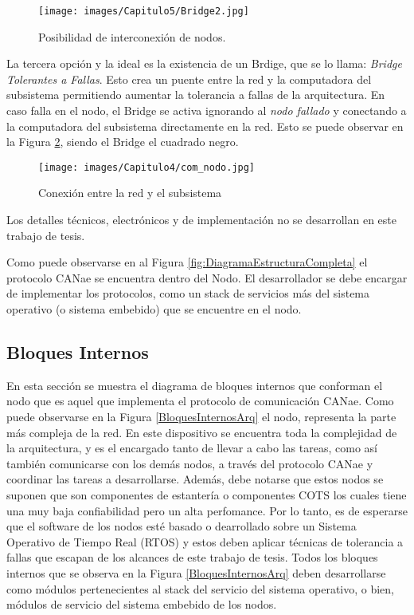 \begin{figure}[h!]
 \centering
 \texttt{[image: images/Capitulo5/Bridge2.jpg]}
  \caption{Posibilidad de interconexión de nodos.}
\label{fig:Bridge2}
\end{figure} 

La tercera opción y la ideal es la existencia de un Brdige, que se lo llama: 
\textit{Bridge Tolerantes a Fallas}. Esto crea un puente entre la red y la computadora
del subsistema permitiendo aumentar la tolerancia a fallas de la arquitectura. En 
caso falla en el nodo, el Bridge se activa ignorando al \textit{nodo fallado} y 
conectando a la computadora del subsistema directamente en la red.  Esto se puede observar
en la Figura \ref{fig:conn_prop}, siendo el Bridge el cuadrado negro.

\begin{figure}[h!]
 \centering
 \texttt{[image: images/Capitulo4/com\_nodo.jpg]}
 \caption{Conexión entre la red y el subsistema}
\label{fig:conn_prop}
\end{figure}

Los detalles técnicos, electrónicos y de implementación no se desarrollan en
este trabajo de tesis. 

Como puede observarse en al Figura \ref{fig:DiagramaEstructuraCompleta} el
protocolo CANae se encuentra dentro del Nodo. El desarrollador se debe encargar
de implementar los protocolos, como un stack de servicios más del 
sistema operativo (o sistema embebido) que se encuentre en el nodo.

\subsection{Bloques Internos}
En esta sección se muestra el diagrama de bloques internos que conforman el
nodo que es aquel que implementa el protocolo de comunicación CANae. Como
puede observarse en la Figura \ref{BloquesInternosArq} el nodo, representa
la parte más compleja de la red. En este dispositivo se encuentra toda la
complejidad de la arquitectura, y es el encargado tanto de llevar a cabo
las tareas, como así también comunicarse con los demás nodos, a través del
protocolo CANae y coordinar las tareas a desarrollarse. Además,
debe notarse que estos nodos se suponen que son componentes de estantería
o componentes \ac{COTS} los cuales tiene una muy baja confiabilidad pero
un alta perfomance. Por lo tanto, es de esperarse que el software de los
nodos esté basado o dearrollado sobre un Sistema Operativo de Tiempo
Real (RTOS) y estos deben aplicar técnicas de tolerancia a fallas que
escapan de los alcances de este trabajo de tesis. Todos los bloques
internos que se observa en la Figura \ref{BloquesInternosArq} deben
desarrollarse como módulos pertenecientes al stack del servicio del
sistema operativo, o bien, módulos de servicio del sistema embebido de
los nodos.

